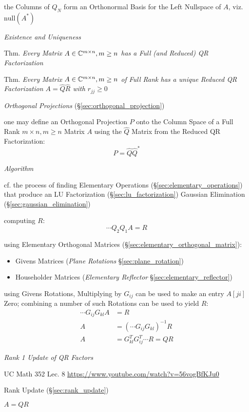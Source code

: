 the Columns of $Q_N$ form an Orthonormal Basis for the Left Nullspace of $A$,
viz. $\mathrm{null}(A^*)$


\emph{Existence and Uniqueness}

Thm. \emph{Every Matrix $A \in \mathbb{C}^{m \times n}, m \geq n$ has a Full (and
  Reduced) QR Factorization}

Thm. \emph{Every Matrix $A \in \mathbb{C}^{m \times n}, m \geq n$ of Full Rank has
  a unique Reduced QR Factorization $A = \hat{Q}\hat{R}$ with $r_{jj} \geq 0$}


\emph{Orthogonal Projections} (\S\ref{sec:orthogonal_projection})

one may define an Orthogonal Projection $P$ onto the Column Space of a Full Rank
$m \times n, m \geq n$ Matrix $A$ using the $\hat{Q}$ Matrix from the Reduced
QR Factorization:
\[
  P = \hat{Q}\hat{Q}^*
\]


\emph{Algorithm}

cf. the process of finding Elementary Operations
(\S\ref{sec:elementary_operations}) that produce an LU Factorization
(\S\ref{sec:lu_factorization}) \fist Gaussian Elimination
(\S\ref{sec:gaussian_elimination})

computing $R$:
\[
  \cdots Q_2 Q_1 A = R
\]

using Elementary Orthogonal Matrices (\S\ref{sec:elementary_orthogonal_matrix}):
\begin{itemize}
  \item Givens Matrices (\emph{Plane Rotations} \S\ref{sec:plane_rotation})
  \item Householder Matrices (\emph{Elementary Reflector}
    \S\ref{sec:elementary_reflector})
\end{itemize}

using Givens Rotations, Multiplying by $G_{ij}$ can be used to make an entry
$A[ji]$ Zero; combining a number of such Rotations can be used to yield $R$:
\begin{align*}
  \cdots G_{ij}G_{kl}A & = R \\
  A & = (\cdots G_{ij}G_{kl})^{-1}R \\
  A & = G_{kl}^T G_{ij}^T \cdots R = QR
\end{align*}


\emph{Rank 1 Update of QR Factors}

UC Math 352 Lec. 8 \url{https://www.youtube.com/watch?v=56vogBfKJu0}

Rank Update (\S\ref{sec:rank_update})

$A = QR$

